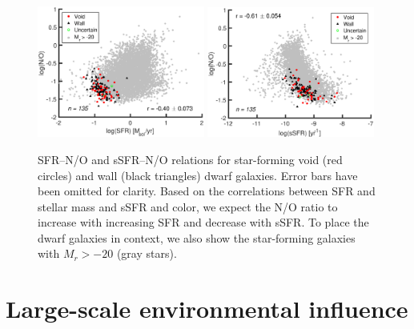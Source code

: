 \begin{figure}
    \includegraphics[width=0.49\textwidth]{Images/Paper2/SFR_NO_1sig_I06_dwarf_0-20_SF_t3}
    \includegraphics[width=0.49\textwidth]{Images/Paper2/sSFR_NO_1sig_I06_dwarf_0-20_SF_t3}
    \caption[(s)SFR versus N/O for 135 dwarf galaxy sample]{SFR--N/O and 
    sSFR--N/O relations for star-forming void (red circles) and wall (black 
    triangles) dwarf galaxies.  Error bars have been omitted for clarity.  Based 
    on the correlations between SFR and stellar mass and sSFR and color, we 
    expect the N/O ratio to increase with increasing SFR and decrease with sSFR.  
    To place the dwarf galaxies in context, we also show the star-forming 
    galaxies with $M_r > -20$ (gray stars).}
    \label{fig:SFR_NO}
\end{figure}


%
%
\section[Environmental influence]{Large-scale environmental influence}\label{sec:environment}

